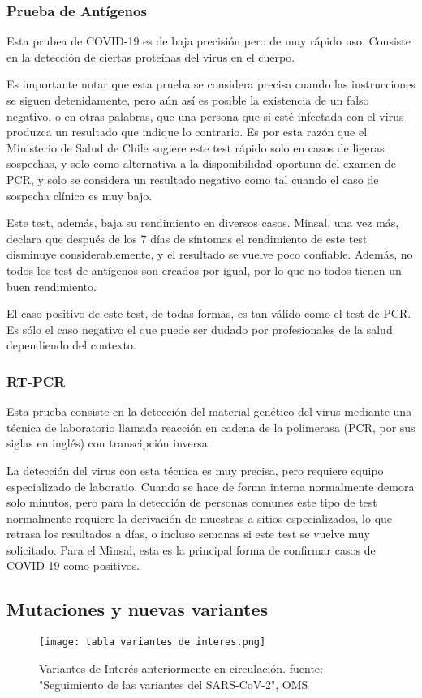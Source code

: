 \subsubsection*{Prueba de Antígenos}
Esta prubea de COVID-19 es de baja precisión pero de muy rápido uso. Consiste en la detección de ciertas proteínas del virus en el cuerpo.

Es importante notar que esta prueba se considera precisa cuando las instrucciones se siguen detenidamente, pero aún así es posible la existencia de un falso negativo, o en otras palabras, que una persona que si esté infectada con el virus produzca un resultado que indique lo contrario. Es por esta razón que el Ministerio de Salud de Chile sugiere este test rápido solo en casos de ligeras sospechas, y solo como alternativa a la disponibilidad oportuna del examen de PCR, y solo se considera un resultado negativo como tal cuando el caso de sospecha clínica es muy bajo. \cite{salud}

Este test, además, baja su rendimiento en diversos casos. Minsal, una vez más, declara que después de los 7 días de síntomas el rendimiento de este test disminuye considerablemente, y el resultado se vuelve poco confiable. Además, no todos los test de antígenos son creados por igual, por lo que no todos tienen un buen rendimiento.

El caso positivo de este test, de todas formas, es tan válido como el test de PCR. Es sólo el caso negativo el que puede ser dudado por profesionales de la salud dependiendo del contexto.

\subsubsection*{RT-PCR}
Esta prueba consiste en la detección del material genético del virus mediante una técnica de laboratorio llamada reacción en cadena de la polimerasa (PCR, por sus siglas en inglés) con transcipción inversa.

La detección del virus con esta técnica es muy precisa, pero requiere equipo especializado de laboratio. Cuando se hace de forma interna normalmente demora solo minutos, pero para la detección de personas comunes este tipo de test normalmente requiere la derivación de muestras a sitios especializados, lo que retrasa los resultados a días, o incluso semanas si este test se vuelve muy solicitado. Para el Minsal, esta es la principal forma de confirmar casos de COVID-19 como positivos.


\subsection*{Mutaciones y nuevas variantes}
\begin{figure*}
    \texttt{[image: tabla variantes de interes.png]}
    \caption{Variantes de Interés anteriormente en circulación. fuente: "Seguimiento de las variantes del SARS-CoV-2", OMS}
\end{figure*}


